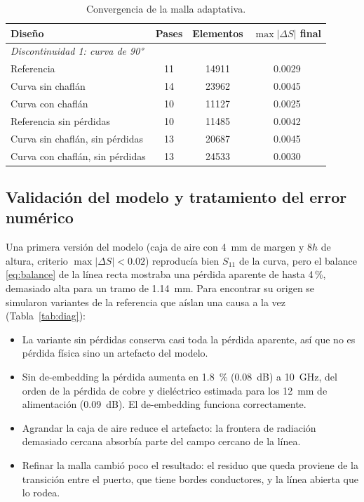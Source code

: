 \documentclass[11pt,letterpaper]{article}
\begin{document}
\begin{table}[htbp]
\centering
\caption{Convergencia de la malla adaptativa.}
\label{tab:conv}
\footnotesize
\renewcommand{\arraystretch}{0.86}
\begin{tabular}{lccc}
\toprule
Diseño & Pases & Elementos & $\max|\Delta S|$ final \\
\midrule
\multicolumn{4}{l}{\textit{Discontinuidad 1: curva de \ang{90}}} \\
Referencia & 11 & \num{14911} & 0.0029 \\
Curva sin chaflán & 14 & \num{23962} & 0.0045 \\
Curva con chaflán & 10 & \num{11127} & 0.0025 \\
Referencia sin pérdidas & 10 & \num{11485} & 0.0042 \\
Curva sin chaflán, sin pérdidas & 13 & \num{20687} & 0.0045 \\
Curva con chaflán, sin pérdidas & 13 & \num{24533} & 0.0030 \\
\midrule
\end{tabular}
\end{table}

\subsection{Validación del modelo y tratamiento del error numérico}
\label{sec:validacion}
Una primera versión del modelo (caja de aire con \SI{4}{mm} de margen y $8h$ de altura, criterio $\max|\Delta S|<0.02$) reproducía bien $S_{11}$ de la curva, pero el balance \eqref{eq:balance} de la línea recta mostraba una pérdida aparente de hasta 4\,\%, demasiado alta para un tramo de \SI{1.14}{mm}. Para encontrar su origen se simularon variantes de la referencia que aíslan una causa a la vez (Tabla~\ref{tab:diag}):
\begin{itemize}
\item La variante sin pérdidas conserva casi toda la pérdida aparente, así que no es pérdida física sino un artefacto del modelo.
\item Sin de-embedding la pérdida aumenta en \SI{1.8}{\percent} (\SI{0.08}{dB}) a \SI{10}{GHz}, del orden de la pérdida de cobre y dieléctrico estimada para los \SI{12}{mm} de alimentación (\SI{0.09}{dB}). El de-embedding funciona correctamente.
\item Agrandar la caja de aire reduce el artefacto: la frontera de radiación demasiado cercana absorbía parte del campo cercano de la línea.
\item Refinar la malla cambió poco el resultado: el residuo que queda proviene de la transición entre el puerto, que tiene bordes conductores, y la línea abierta que lo rodea.
\end{itemize}
\end{document}
